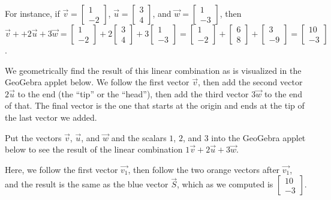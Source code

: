 \documentclass{ximera}
\begin{document}
  For instance, if $\vec{v}=\begin{bmatrix}1\\-2\end{bmatrix}$, $\vec{u}= \begin{bmatrix}3\\4\end{bmatrix}$, and $\vec{w}=\begin{bmatrix}1\\-3\end{bmatrix}$, then $\vec{v} + +2\vec{u}+3\vec{w} = \begin{bmatrix}1\\-2\end{bmatrix} + 2\begin{bmatrix}3\\4\end{bmatrix} + 3\begin{bmatrix}1\\-3\end{bmatrix} = \begin{bmatrix}1\\-2\end{bmatrix} + \begin{bmatrix}6\\8\end{bmatrix} + \begin{bmatrix}3\\-9\end{bmatrix} = \begin{bmatrix}10\\-3\end{bmatrix}$.

  We geometrically find the result of this linear combination as is visualized in the GeoGebra applet below. We follow the first vector $\vec{v}$, then add the second vector $2\vec{u}$ to the end (the ``tip'' or the ``head''), then add the third vector $3\vec{w}$ to the end of that. The final vector is the one that starts at the origin and ends at the tip of the last vector we added.

  Put the vectors $\vec{v}$, $\vec{u}$, and $\vec{w}$ and the scalars $1$, $2$, and $3$ into the GeoGebra applet below to see the result of the linear combination $1\vec{v} + 2\vec{u} + 3\vec{w}$.

  \begin{center}
  \end{center}

  Here, we follow the first vector $\vec{v_1}$, then follow the two orange vectors after $\vec{v_1}$, and the result is the same as the blue vector $\vec{S}$, which as we computed is $\begin{bmatrix}10\\-3\end{bmatrix}$.
\end{document}
